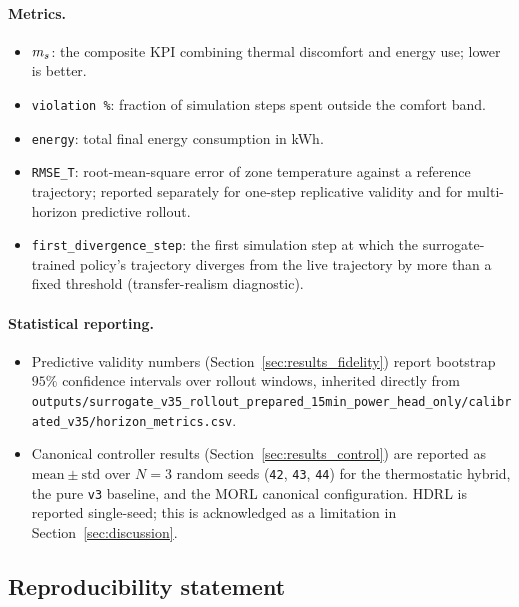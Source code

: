 \paragraph{Metrics.}
\begin{itemize}
    \item $m_s$: the \boptest{} composite KPI combining thermal
    discomfort and energy use; lower is better.
    \item \texttt{violation\,\%}: fraction of simulation steps spent outside
    the comfort band.
    \item \texttt{energy}: total final energy consumption in kWh.
    \item \texttt{RMSE\_T}: root-mean-square error of zone temperature
    against a reference trajectory; reported separately for one-step
    replicative validity and for multi-horizon predictive rollout.
    \item \texttt{first\_divergence\_step}: the first simulation step at
    which the surrogate-trained policy's trajectory diverges from the live
    \boptest{} trajectory by more than a fixed threshold (transfer-realism
    diagnostic).
\end{itemize}

\paragraph{Statistical reporting.}
\begin{itemize}
    \item Predictive validity numbers (Section~\ref{sec:results_fidelity})
    report bootstrap $95\%$ confidence intervals over rollout windows,
    inherited directly from
    \texttt{outputs/surrogate\_v35\_rollout\_prepared\_15min\_power\_head\_only/calibrated\_v35/horizon\_metrics.csv}.
    \item Canonical controller results (Section~\ref{sec:results_control})
    are reported as \mbox{$\mathrm{mean} \pm \mathrm{std}$} over
    $N=3$ random seeds (\texttt{42}, \texttt{43}, \texttt{44}) for the
    thermostatic hybrid, the pure \texttt{v3} baseline, and the MORL
    canonical configuration. HDRL is reported single-seed; this is
    acknowledged as a limitation in Section~\ref{sec:discussion}.
\end{itemize}

\subsection{Reproducibility statement}
\label{ssec:exp_reproducibility}

